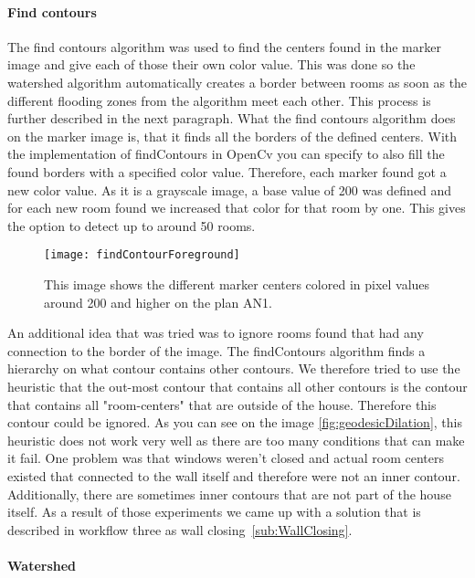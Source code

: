 \paragraph{Find contours}
\label{sub:FindContours}
The find contours algorithm was used to find the centers found in the marker image and give each of those their own color value. This was done so the watershed algorithm automatically creates a border between rooms as soon as the different flooding zones from the algorithm meet each other. This process is further described in the next paragraph. What the find contours algorithm does on the marker image is, that it finds all the borders of the defined centers. With the implementation of findContours in OpenCv you can specify to also fill the found borders with a specified color value. Therefore, each marker found got a new color value. As it is a grayscale image, a base value of 200 was defined and for each new room found we increased that color for that room by one. This gives the option to detect up to around 50 rooms.

\begin{figure}[H]
	\centering
	\texttt{[image: findContourForeground]}
	\caption{This image shows the different marker centers colored in pixel values around 200 and higher on the plan AN1.}
	\label{fig:findContour}
\end{figure}

An additional idea that was tried was to ignore rooms found that had any connection to the border of the image. The findContours algorithm finds a hierarchy on what contour contains other contours. We therefore tried to use the heuristic that the out-most contour that contains all other contours is the contour that contains all "room-centers" that are outside of the house. Therefore this contour could be ignored. As you can see on the image \ref{fig:geodesicDilation}, this heuristic does not work very well as there are too many conditions that can make it fail. One problem was that windows weren't closed and actual room centers existed that connected to the wall itself and therefore were not an inner contour. Additionally, there are sometimes inner contours that are not part of the house itself. As a result of those experiments we came up with a solution that is described in workflow three as wall closing~\ref{sub:WallClosing}.

 
\paragraph{Watershed}
\label{subsubsub:watershed}

